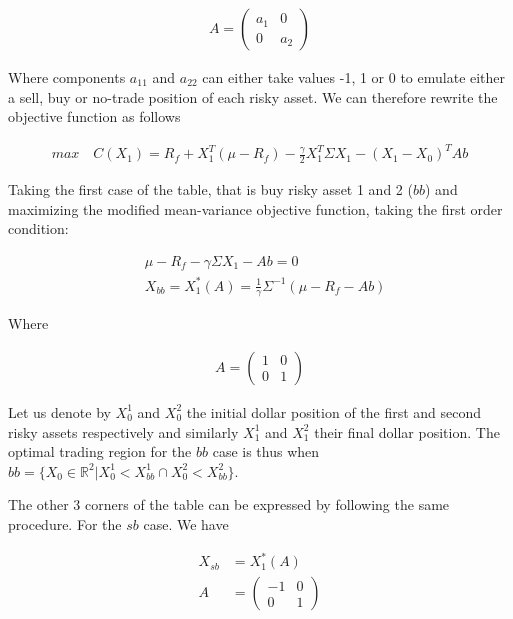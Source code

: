 \documentclass[10pt]{article}
\begin{document}
\begin{align*}
	A = \begin{pmatrix}
a_{1} & 0\\
0 & a_{2}
\end{pmatrix}
\end{align*}

Where components $a_{11}$ and $a_{22}$ can either take values -1, 1 or 0 to emulate either a sell, buy or no-trade position of each risky asset. We can therefore rewrite the objective function as follows

\begin{align*}
	max \quad C(X_1) = R_f  + X_1^T(\mu - R_f)  - \frac{\gamma}{2} X_1^T \Sigma X_1  - (X_1  - X_0)^TAb
\end{align*}

Taking the first case of the table, that is buy risky asset 1 and 2 ($bb$) and maximizing the modified mean-variance objective function, taking the first order condition: 

\begin{align*}
	& \mu - R_f - \gamma \Sigma X_1 - Ab = 0\\
	& X_{bb} = X_1^*(A) = \frac{1}{\gamma}\Sigma^{-1} (\mu - R_f - Ab)
\end{align*}

Where 

\begin{align*}
	A = \begin{pmatrix}
	1 & 0\\	
	0 & 1
\end{pmatrix}
\end{align*}

Let us denote by $X_0^1$ and $X_0^2$ the initial dollar position of the first and second risky assets respectively and similarly $X_1^1$ and $X_1^2$ their final dollar position. The optimal trading region for the $bb$ case is thus when $bb = \{ X_0 \in \mathbb{R}^2 \vert X_0^1 < X_{bb}^1 \cap  X_0^2 < X_{bb}^2\}$.

\bigbreak

The other 3 corners of the table can be expressed by following the same procedure. For the $sb$ case. We have 

\begin{align*}
	X_{sb} &= X_1^*(A) \\
	A &=  \begin{pmatrix}
	-1 & 0\\	
	0 & 1
\end{pmatrix}
\end{align*}
\end{document}
